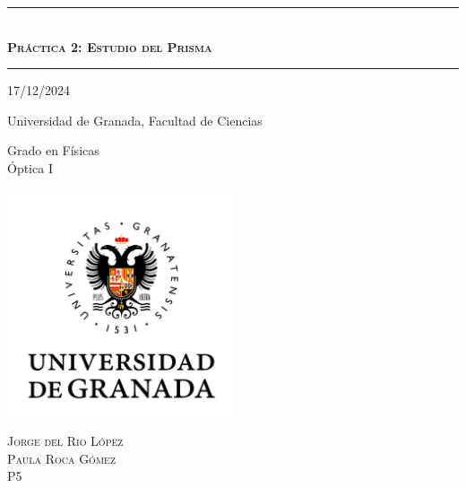 \documentclass[10pt,onecolumn]{article}
\begin{document}
\renewcommand{\headrulewidth}{0.5pt}
\newcommand{\HRule}[1]{\rule{\linewidth}{#1}}
\renewcommand{\refname}{Bibliography}
\renewcommand{\tablename}{Table}
\renewcommand{\contentsname}{Index}
\renewcommand{\figurename}{Fig.}

\onecolumn
\begin{titlepage}
\centering
    {\HRule{2 pt}} \\
    \vspace{0.5cm}
    {\scshape\Huge {\textbf{Práctica 2: Estudio del Prisma}  }}  \\
    \vspace{1 mm}
    
    {\HRule{2 pt}}

    \vspace{1cm}
    \Large 17/12/2024 \\
    \vspace{1cm}
 
    \normalfont\Large Universidad de Granada, Facultad de Ciencias \\
    \vspace{0.5cm}
    
    
     \normalfont\Large Grado en Físicas \\
    \vspace{0.5cm}
     \normalfont Óptica I\\
    \vspace{1.5cm}

\centering
    {\includegraphics[width=0.5\textwidth]{UGR-MARCA-01-color.jpg}\par}

\vfill
    \vspace{1cm}
    \scshape\Large Jorge del Rio López \\
    \scshape\Large Paula Roca Gómez\\

    \vspace{0.5cm}
    \scshape\Large P5

\vfill

\end{titlepage}
\end{document}
